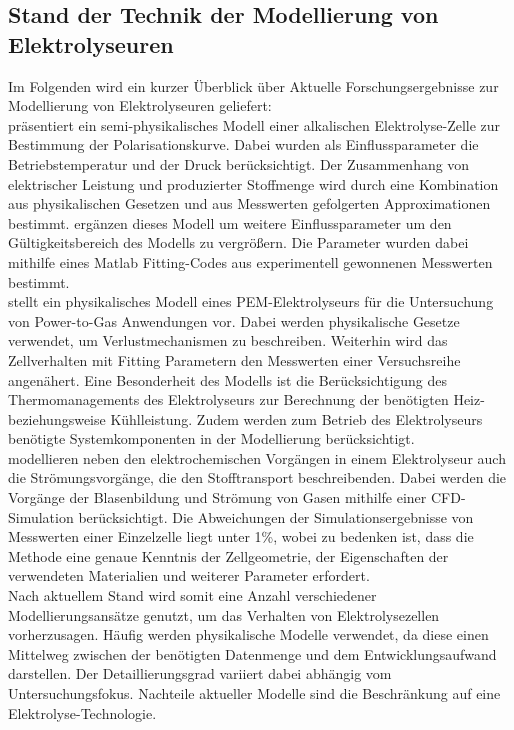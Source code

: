 \subsection{Stand der Technik der Modellierung von Elektrolyseuren}
Im Folgenden wird ein kurzer Überblick über Aktuelle Forschungsergebnisse zur Modellierung von Elektrolyseuren geliefert:\\

\citet{ulleberg_modeling_2003} präsentiert ein semi-physikalisches Modell einer alkalischen Elektrolyse-Zelle zur Bestimmung der Polarisationskurve. Dabei wurden als Einflussparameter die Betriebstemperatur und der Druck berücksichtigt. Der Zusammenhang von elektrischer Leistung und produzierter Stoffmenge wird durch eine Kombination aus physikalischen Gesetzen und aus Messwerten gefolgerten Approximationen bestimmt. \citet{amores_influence_2014} ergänzen dieses Modell um weitere Einflussparameter um den Gültigkeitsbereich des Modells zu vergrößern. Die Parameter wurden dabei mithilfe eines Matlab Fitting-Codes aus experimentell gewonnenen Messwerten bestimmt.\\

\citet{tjarks_pem-elektrolyse-systeme_2017} stellt ein physikalisches Modell eines PEM-Elektrolyseurs für die Untersuchung von Power-to-Gas Anwendungen vor. Dabei werden physikalische Gesetze verwendet, um Verlustmechanismen zu beschreiben. Weiterhin wird das Zellverhalten mit Fitting Parametern den Messwerten einer Versuchsreihe angenähert. Eine Besonderheit des Modells ist die Berücksichtigung des Thermomanagements des Elektrolyseurs zur Berechnung der benötigten Heiz- beziehungsweise Kühlleistung. Zudem werden zum Betrieb des Elektrolyseurs benötigte Systemkomponenten in der Modellierung berücksichtigt.\\

\citet{rodriguez_cfd_2020} modellieren neben den elektrochemischen Vorgängen in einem Elektrolyseur auch die Strömungsvorgänge, die den Stofftransport beschreibenden. Dabei werden die Vorgänge der Blasenbildung und Strömung von Gasen mithilfe einer CFD-Simulation berücksichtigt. Die Abweichungen der Simulationsergebnisse von Messwerten einer Einzelzelle liegt unter 1\%, wobei zu bedenken ist, dass die Methode eine genaue Kenntnis der Zellgeometrie, der Eigenschaften der verwendeten Materialien und weiterer Parameter erfordert.\\

Nach aktuellem Stand wird somit eine Anzahl verschiedener Modellierungsansätze genutzt, um das Verhalten von Elektrolysezellen vorherzusagen. Häufig werden physikalische Modelle verwendet, da diese einen Mittelweg zwischen der benötigten Datenmenge und dem Entwicklungsaufwand darstellen. Der Detaillierungsgrad variiert dabei abhängig vom Untersuchungsfokus. Nachteile aktueller Modelle sind die Beschränkung auf eine Elektrolyse-Technologie.

